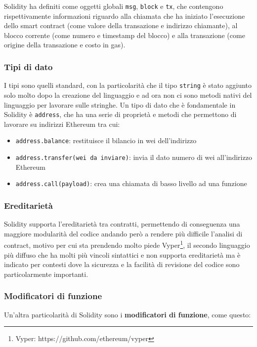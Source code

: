 Solidity ha definiti come oggetti globali \texttt{msg}, \texttt{block} e \texttt{tx},
che contengono rispettivamente informazioni riguardo alla chiamata che ha iniziato 
l'esecuzione dello smart contract (come valore della transazione e indirizzo chiamante), al blocco corrente 
(come numero e timestamp del blocco) e alla transazione (come origine della transazione e costo in gas).

\subsubsection{Tipi di dato}

I tipi sono quelli standard, con la particolarità che il tipo \texttt{string} è stato aggiunto solo molto
dopo la creazione del linguaggio e ad ora non ci sono metodi nativi del linguaggio per lavorare sulle stringhe.
Un tipo di dato che è fondamentale in Solidity è \texttt{address}, che ha una serie di proprietà e metodi che
permettono di lavorare su indirizzi Ethereum tra cui:
\begin{itemize}
    \item \texttt{address.balance}: restituisce il bilancio in wei dell'indirizzo
    \item \texttt{address.transfer(wei da inviare)}: invia il dato numero di wei all'indirizzo Ethereum 
    \item \texttt{address.call(payload)}: crea una chiamata di basso livello ad una funzione
\end{itemize}

\subsubsection{Ereditarietà}

Solidity supporta l'ereditarietà tra contratti, permettendo di conseguenza una maggiore modularità del codice andando
però a rendere più difficile l'analisi di contract, motivo per cui sta prendendo molto piede 
Vyper\footnote{Vyper: https://github.com/ethereum/vyper}, il secondo linguaggio più diffuso che ha molti più vincoli sintattici
e non supporta ereditarietà ma è indicato per contesti dove la sicurezza
e la facilità di revisione del codice sono particolarmente importanti.

\subsubsection{Modificatori di funzione}

Un'altra particolarità di Solidity sono i \textbf{modificatori di funzione}, come questo:

